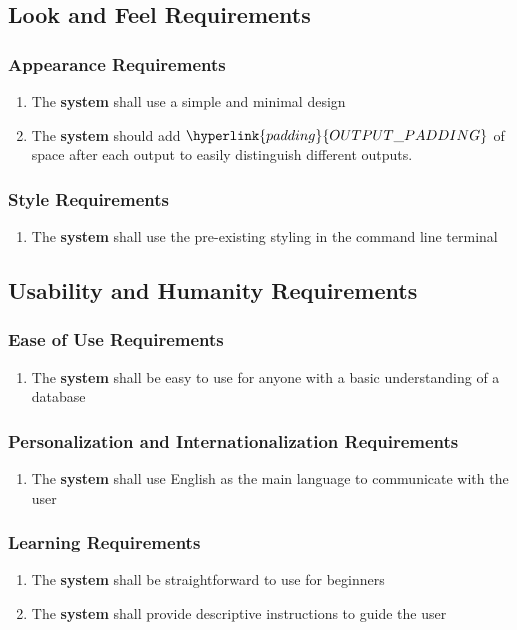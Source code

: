 \documentclass[12pt, titlepage]{article}
\begin{document}
\subsection{Look and Feel Requirements}
    \subsubsection{Appearance Requirements}
        \begin{enumerate}
            \item The \textbf{system} shall use a simple and minimal design
            \item The \textbf{system} should add $\hyperlink{padding}{OUTPUT\_PADDING}$ of space after each output to easily distinguish different outputs.
        \end{enumerate}
    \subsubsection{Style Requirements}
        \begin{enumerate}
            \item The \textbf{system} shall use the pre-existing styling in the command line terminal
        \end{enumerate}
\subsection{Usability and Humanity Requirements}
    \subsubsection{Ease of Use Requirements}
        \begin{enumerate}
            \item The \textbf{system} shall be easy to use for anyone with a basic understanding of a database
        \end{enumerate}
    \subsubsection{Personalization and Internationalization Requirements}
        \begin{enumerate}
            \item The \textbf{system} shall use English as the main language to communicate with the user
        \end{enumerate}
    \subsubsection{Learning Requirements}
        \begin{enumerate}
            \item The \textbf{system} shall be straightforward to use for beginners
            \item The \textbf{system} shall provide descriptive instructions to guide the user
        \end{enumerate}
\end{document}
